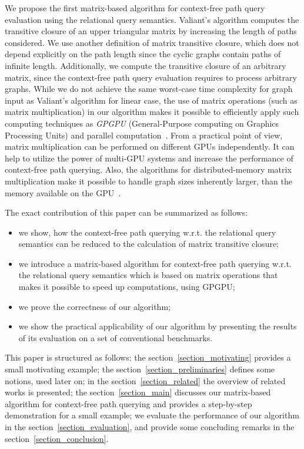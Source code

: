 We propose the first matrix-based algorithm for context-free path query evaluation using the relational query semantics. Valiant's algorithm computes the transitive closure of an upper triangular matrix by increasing the length of paths considered. We use another definition of matrix transitive closure, which does not depend explicitly on the path length since the cyclic graphs contain paths of infinite length. Additionally, we compute the transitive closure of an arbitrary matrix, since the context-free path query evaluation requires to process arbitrary graphs. While we do not achieve the same worst-case time complexity for graph input as Valiant's algorithm for linear case, the use of matrix operations (such as matrix multiplication) in our algorithm makes it possible to efficiently apply such computing techniques as \textit{GPGPU} (General-Purpose computing on Graphics Processing Units) and parallel computation~\cite{matricesOnGPGPU}. From a practical point of view, matrix multiplication can be performed on different GPUs independently. It can help to utilize the power of multi-GPU systems and increase the performance of context-free path querying. Also, the algorithms for distributed-memory matrix multiplication make it possible to handle graph sizes inherently larger, than the memory available on the GPU~\cite{MM_on_multi-GPU, hetero_multi-GPU, choi1994pumma}.

The exact contribution of this paper can be summarized as follows:

\begin{itemize}
\item we show, how the context-free path querying w.r.t. the relational query semantics can be reduced to the calculation of matrix transitive closure;
\item we introduce a matrix-based algorithm for context-free path querying w.r.t. the relational query semantics which is based on matrix operations that makes it possible to speed up computations, using GPGPU;
\item we prove the correctness of our algorithm;
\item we show the practical applicability of our algorithm by presenting the results of its evaluation on a set of conventional benchmarks.
\end{itemize}

This paper is structured as follows: the section~\ref{section_motivating} provides a small motivating example; the section~\ref{section_preliminaries} defines some notions, used later on; in the section~\ref{section_related} the overview of related works is presented; the section~\ref{section_main} discusses our matrix-based algorithm for context-free path querying and provides a step-by-step demonstration for a small example;  we evaluate the performance of our algorithm in the section~\ref{section_evaluation}, and provide some concluding remarks in the section~\ref{section_conclusion}.

